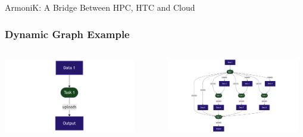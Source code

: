\documentclass[10pt,aspectratio=1609]{beamer}
\begin{document}
\begin{section}{ArmoniK: A Bridge Between HPC, HTC and Cloud}
  \begin{frame}
    \frametitle{Dynamic Graph Example}
    \begin{columns}[T]
      \begin{column}{0.3\textwidth}
        \centering
        \vspace{1cm}
        \vfill
        \includegraphics[width=0.95\textwidth]{mermaid-dynamic-part1.png}
      \end{column}
      \begin{column}{0.05\textwidth}
        \centering
        \vspace{1.7cm}
        \vfill
        $\Rightarrow$
      \end{column}
      \begin{column}{0.65\textwidth}
        \centering
        \includegraphics[width=0.95\textwidth]{mermaid-dynamic-part2.png}
      \end{column}
    \end{columns}
  \end{frame}


\end{section}
\end{document}
